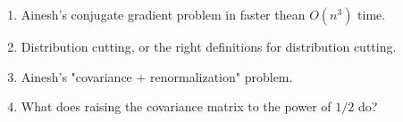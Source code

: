 \begin{enumerate}
\item Ainesh's conjugate gradient problem in faster thean
$O(n^3)$ time.
\item Distribution cutting, or the right definitions for
distribution cutting.
\item Ainesh's "covariance + renormalization" problem.
\item What does raising the covariance matrix to the power of
$1/2$ do?
\end{enumerate}
